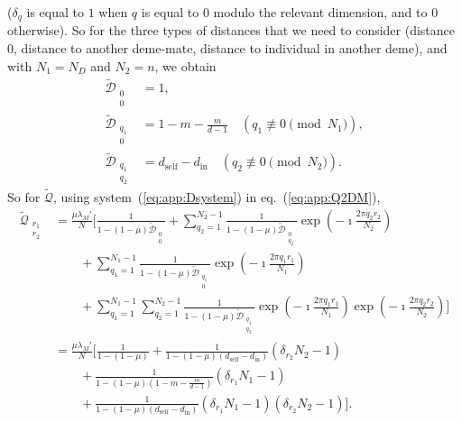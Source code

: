 \documentclass[11pt, letterpaper]{article}
\renewcommand{\eqref}[1]{\textup{{\normalfont eq.~(\ref{#1}}\normalfont)}}
\newcommand{\sysref}[1]{system~(\ref{#1})}
\newcommand{\self}{\textrm{self}}
\newcommand{\inn}{\textrm{in}}
\newcommand{\din}{d_{\inn}}
\newcommand{\dself}{d_{\self}}
\newcommand{\ndemes}{N_D}
\begin{document}
%
($\delta_q$ is equal to $1$ when $q$ is equal to $0$ modulo the relevant dimension, and to $0$ otherwise). So for the three types of distances that we need to consider (distance $0$, distance to another deme-mate, distance to individual in another deme), and with $N_1 = \ndemes$ and $N_2 = n$, we obtain
%
\begin{subequations}\label{eq:app:Dsystem}
\begin{align}
\tilde{\mathcal{D}}_{\substack{0\\0}} & = 1,\\
%
\tilde{\mathcal{D}}_{\substack{q_1\\0}} & = 1-m -  \frac{m}{d-1} \quad (q_1 \not \equiv 0 \pmod{N_1}),\\
%
\tilde{\mathcal{D}}_{\substack{q_1\\q_2}} & = \dself - \din \quad (q_2 \not \equiv 0 \pmod{N_2}).
\end{align}
\end{subequations}
%
So for $\tilde{\mathcal{Q}}$, using \sysref{eq:app:Dsystem} in \eqref{eq:app:Q2DM}, 
%
\begin{align}
\tilde{\mathcal{Q}}_{\substack{r_1\\r_2}}&= \frac{\mu \lambda_M'}{N} \Bigg[  \frac{1}{1 - (1-\mu) \tilde{\mathcal{D}}_{\substack{0\\ 0}}} + \sum_{q_2 = 1}^{N_2-1}\frac{1}{1 - (1-\mu) \tilde{\mathcal{D}}_{\substack{0\\ q_2}}} \exp\left(-\imath \frac{2\pi q_2 r_2}{N_2}\right) \nonumber \\
& \qquad 
+ \sum_{q_1 =1}^{N_1 - 1} \frac{1}{1 - (1-\mu) \tilde{\mathcal{D}}_{\substack{q_1\\ 0}}} \exp\left(-\imath \frac{2\pi q_1 r_1}{N_1}\right) \nonumber \\
& \qquad 
+ 
 \sum_{q_1=1}^{N_1 -1} \sum_{q_2=1}^{N_2 -1} \frac{1}{1 - (1-\mu) \tilde{\mathcal{D}}_{\substack{q_1\\ q_2}}} \exp\left(-\imath \frac{2\pi q_1 r_1}{N_1}\right)\exp\left(-\imath \frac{2\pi q_2 r_2}{N_2}\right) \Bigg]\nonumber \\
& = \frac{\mu \lambda_M'}{N} \Bigg[  \frac{1}{1 - (1-\mu) } 
+ \frac{1}{1 - (1-\mu) (\dself - \din)} (\delta_{r_2} N_2 - 1) \nonumber \\
& \qquad 
+  \frac{1}{1 - (1-\mu) (1-m-\frac{m}{d-1})} (\delta_{r_1} N_1 - 1) \nonumber \\
& \qquad 
+ 
\frac{1}{1 - (1-\mu) (\dself - \din) } (\delta_{r_1} N_1 - 1) (\delta_{r_2} N_2 - 1) \Bigg].\label{eq:app:Q2DMsol}
% 
\end{align}
\end{document}
